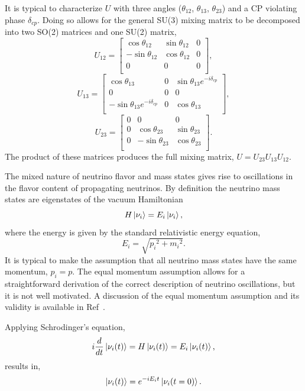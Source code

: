 It is typical to characterize $U$ with three angles
($\theta_{12}$, $\theta_{13}$, $\theta_{23}$) and a CP violating
phase $\delta_{cp}$. Doing so allows for the general SU(3) mixing matrix to
be decomposed into two SO(2) matrices and one SU(2) matrix,
$$U_{12} =
\begin{bmatrix}
    \cos\theta_{12} & \sin\theta_{12} & 0  \\
    -\sin\theta_{12}& \cos\theta_{12} & 0  \\
    0 & 0 & 0  \\
\end{bmatrix},
$$
$$
U_{13} =
\begin{bmatrix}
    \cos\theta_{13} & 0 & \sin\theta_{13}e^{-i\delta_{cp}}\\
    0 & 0 & 0  \\
    -\sin\theta_{13} e^{-i\delta_{cp}} & 0 & \cos\theta_{13}  \\
\end{bmatrix},
$$
$$
U_{23} =
\begin{bmatrix}
    0 & 0 & 0  \\
    0 & \cos\theta_{23} & \sin\theta_{23} \\
    0 & -\sin\theta_{23} & \cos\theta_{23}   \\
\end{bmatrix}.
$$
The product of these matrices produces the full mixing matrix,
$U = U_{23}U_{13}U_{12}$.

The mixed nature of neutrino flavor and mass states gives rise to oscillations
in the flavor content of propagating neutrinos.
By definition the neutrino mass states are eigenstates of the vacuum Hamiltonian
\begin{equation}
    H\ket{\nu_{i}} = E_{i}\ket{\nu_{i}}\text{,}
\end{equation}
where the energy is given by the standard relativistic energy equation,
\begin{equation}
    E_{i} = \sqrt{{p_{i}}^{2} + {m_{i}}^2}\text{.}
\end{equation}
It is typical to make the assumption that all neutrino mass states have the same
momentum, $p_{i} = p$.
The equal momentum assumption allows for a straightforward derivation of the
correct description of neutrino oscillations, but it is not well motivated.
A discussion of the equal momentum assumption and its validity
is available in Ref~\citep{neutrino_osc_subtleties}.

Applying Schrodinger's equation,
\begin{equation}
    i\frac{d}{dt}\ket{\nu_{i}(t)} = H\ket{\nu_{i}(t)} = E_{i}\ket{\nu_{i}(t)}\text{,}
\label{eq:mass_state_evolution}
\end{equation}
results in,
\begin{equation}
    \ket{\nu_{i}(t)} = e^{-iE_{i}t}\ket{\nu_{i}(t=0)}\text{.}
    \label{eqn:mass_state_tevol}
\end{equation}

